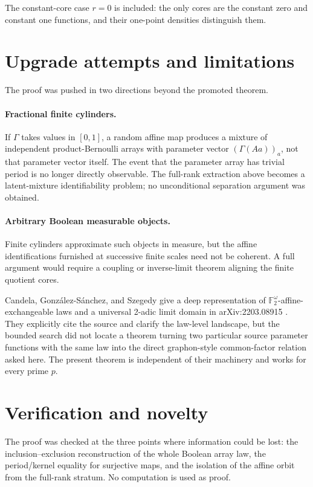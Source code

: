 \documentclass[11pt]{article}
\newcommand{\F}{\mathbb F}
\begin{document}
The constant-core case $r=0$ is included: the only cores are the constant
zero and constant one functions, and their one-point densities distinguish
them.

\section{Upgrade attempts and limitations}

The proof was pushed in two directions beyond the promoted theorem.

\paragraph{Fractional finite cylinders.}
If $\Gamma$ takes values in $[0,1]$, a random affine map produces a mixture of
independent product-Bernoulli arrays with parameter vector
$(\Gamma(Aa))_a$, not that parameter vector itself.  The event that the
parameter array has trivial period is no longer directly observable.  The
full-rank extraction above becomes a latent-mixture identifiability problem;
no unconditional separation argument was obtained.

\paragraph{Arbitrary Boolean measurable objects.}
Finite cylinders approximate such objects in measure, but the affine
identifications furnished at successive finite scales need not be coherent.
A full argument would require a coupling or inverse-limit theorem aligning
the finite quotient cores.

Candela, Gonz\'alez-S\'anchez, and Szegedy give a deep representation of
$\F_2^\omega$-affine-exchangeable laws and a universal 2-adic limit domain in
arXiv:2203.08915 \cite{CGS}.  They explicitly cite the source and clarify the
law-level landscape, but the bounded search did not locate a theorem turning
two particular source parameter functions with the same law into the direct
graphon-style common-factor relation asked here.  The present theorem is
independent of their machinery and works for every prime $p$.

\section{Verification and novelty}

The proof was checked at the three points where information could be lost:
the inclusion--exclusion reconstruction of the whole Boolean array law, the
period/kernel equality for surjective maps, and the isolation of the affine
orbit from the full-rank stratum.  No computation is used as proof.
\end{document}
